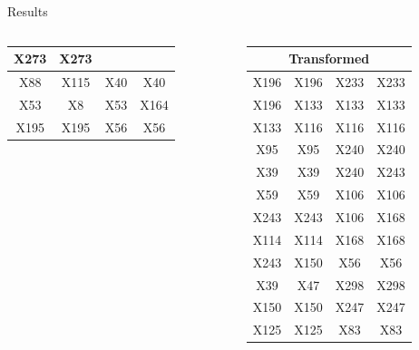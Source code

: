 \documentclass[final]{beamer} %
\newcommand{\boz}{\cellcolor{pathwaynode}}
\newcommand{\ghool}{\cellcolor{independentnode}}
\begin{document}
\begin{frame}{}
\begin{block}{Results}
\begin{columns}
\begin{column}{0.25\textwidth}
\begin{columns}
\begin{column}{0.5\textwidth}
\begin{tabular}{| c c || c c |}
                X273   &  X273  \\ \hline
                \ghool X88   &  X115  &
                X40   &  X40  \\ \hline
                X53   &  X8  &
                X53   &  X164  \\ \hline
                X195   &  X195  &
                X56   &  X56  \\ \hline
              \end{tabular}
            \end{column}
            \begin{column}{0.5\textwidth}
              \center
              \tiny
              \begin{tabular}{| c c || c c |}
                \hline
                \toprule
                \multicolumn{4}{c}{Transformed} \\ 
                \midrule \hline
                \boz X196   &  \boz X196  &
                X233   &  X233  \\ \hline
                \boz X196   &  \boz X133  &
                \boz X133   &  \boz X133  \\ \hline
                \boz X133   &  \boz X116  &
                \boz X116   &  \boz X116  \\ \hline
                X95   &  X95  &
                \boz X240   &  \boz X240  \\ \hline
                X39   &  X39  &
                \boz X240   &  \boz X243  \\ \hline
                X59   &  X59  &
                X106   &  X106  \\ \hline
                \boz X243   &  \boz X243  &
                X106   &  X168  \\ \hline
                X114   &  X114  &
                X168   &  X168  \\ \hline
                \boz X243   &  \boz X150  &
                X56   &  X56  \\ \hline
                X39   &  X47  &
                X298   &  X298  \\ \hline
                \boz X150   &  \boz X150  &
                X247   &  X247  \\ \hline
                \boz X125   &  \boz X125  &
                X83   &  X83  \\ \hline
              \end{tabular}
            \end{column}
          \end{columns}
        \end{column}


\end{columns}
\end{block}
\end{frame}
\end{document}
